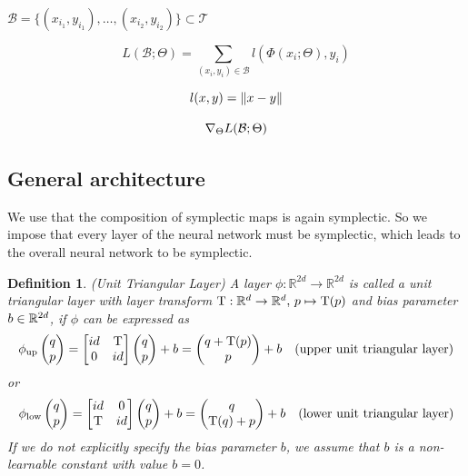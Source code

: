 \documentclass[twoside,a4paper]{article}
\newtheorem{definition}{Definition}
\begin{document}

$\mathcal{B} = \{(x_{i_1}, y_{i_1}), \dots, (x_{i_2},y_{i_2}) \} \subset \mathcal{T}$

\begin{equation*}
	L(\mathcal{B}; \Theta) = \sum_{(x_i,y_i) \in \mathcal{B}} l(\Phi(x_i; \Theta), y_i)
\end{equation*}

\begin{equation*}
	l(x,y) = \norm{x-y}
\end{equation*}

\begin{equation*}
	\grad[\Theta]{L(\mathcal{B};\Theta)}
\end{equation*}




\subsection{General architecture}

We use that the composition of symplectic maps is again symplectic. So we impose that every
layer of the neural network must be symplectic, which leads to the overall neural network
to be symplectic.

\begin{definition}
	(Unit Triangular Layer) A layer $\phi : \mathbb{R}^{2d} \to \mathbb{R}^{2d}$ 
	is called a unit triangular layer with layer transform 
	$\layertf : \mathbb{R}^d \to \mathbb{R}^d,\, p \mapsto \layertf(p)$
	and bias parameter $b \in \R^{2d}$, if $\phi$ can be expressed as
	\begin{equation*}
		\phi_\up \qpvec = \uppersympop{\layertf} + b
		= \begin{pmatrix}
			q + \layertf(p) \\
			p
		\end{pmatrix} + b \quad \text{(upper unit triangular layer)}
	\end{equation*}
	or
	\begin{equation*}
		\phi_\low \qpvec = \lowersympop{\layertf} + b
		= \begin{pmatrix}
			q \\
			\layertf(q) + p
		\end{pmatrix} + b \quad \text{(lower unit triangular layer)}
	\end{equation*}
	If we do not explicitly specify the bias parameter $b$, we assume
	that $b$ is a non-learnable constant with value $b=0$.
\end{definition}
\end{document}
